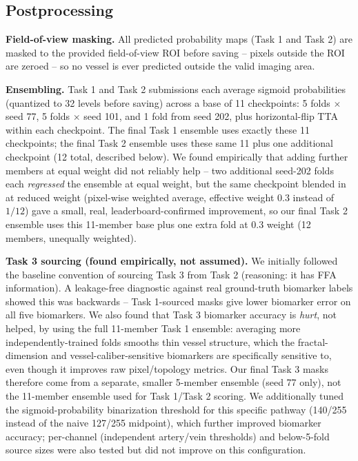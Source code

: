 \documentclass[runningheads]{llncs}
\begin{document}
\subsection{Postprocessing}\label{sec:postprocessing}
\textbf{Field-of-view masking.} All predicted probability maps (Task 1 and
Task 2) are masked to the provided field-of-view ROI before saving --
pixels outside the ROI are zeroed -- so no vessel is ever predicted outside
the valid imaging area.

\textbf{Ensembling.} Task 1 and Task 2 submissions each average sigmoid
probabilities (quantized to 32 levels before saving) across a base of 11
checkpoints: 5 folds $\times$ seed 77, 5 folds $\times$ seed 101, and 1 fold
from seed 202, plus horizontal-flip TTA within each checkpoint. The final
Task 1 ensemble uses exactly these 11 checkpoints; the final Task 2
ensemble uses these same 11 plus one additional checkpoint (12 total,
described below). We found empirically
that adding further members at equal weight did not reliably help -- two
additional seed-202 folds each \emph{regressed} the ensemble at equal
weight, but the same checkpoint blended in at reduced weight (pixel-wise
weighted average, effective weight 0.3 instead of $1/12$) gave a small,
real, leaderboard-confirmed improvement, so our final Task 2 ensemble uses
this 11-member base plus one extra fold at 0.3 weight (12 members,
unequally weighted).

\textbf{Task 3 sourcing (found empirically, not assumed).} We initially
followed the baseline convention of sourcing Task 3 from Task 2 (reasoning:
it has FFA information). A leakage-free diagnostic against real ground-truth
biomarker labels showed this was backwards -- Task 1-sourced masks give
lower biomarker error on all five biomarkers. We also found that Task 3
biomarker accuracy is \emph{hurt}, not helped, by using the full 11-member
Task 1 ensemble: averaging more independently-trained folds smooths thin
vessel structure, which the fractal-dimension and vessel-caliber-sensitive
biomarkers are specifically sensitive to, even though it improves raw
pixel/topology metrics. Our final Task 3 masks therefore come from a
separate, smaller 5-member ensemble (seed 77 only), not the 11-member
ensemble used for Task 1/Task 2 scoring. We additionally tuned the
sigmoid-probability binarization threshold for this specific pathway
(140/255 instead of the naive 127/255 midpoint), which further improved
biomarker accuracy; per-channel (independent artery/vein thresholds) and
below-5-fold source sizes were also tested but did not improve on this
configuration.
\end{document}
